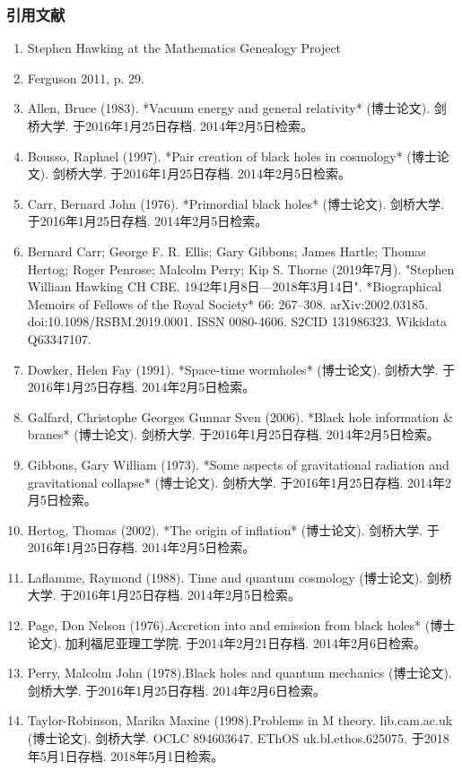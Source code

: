 \subsubsection{引用文献} 
\begin{enumerate}
\item Stephen Hawking at the Mathematics Genealogy Project  
\item Ferguson 2011, p. 29.  
\item Allen, Bruce (1983). *Vacuum energy and general relativity* (博士论文). 剑桥大学. 于2016年1月25日存档. 2014年2月5日检索。  
\item Bousso, Raphael (1997). *Pair creation of black holes in cosmology* (博士论文). 剑桥大学. 于2016年1月25日存档. 2014年2月5日检索。  
\item Carr, Bernard John (1976). *Primordial black holes* (博士论文). 剑桥大学. 于2016年1月25日存档. 2014年2月5日检索。  
\item Bernard Carr; George F. R. Ellis; Gary Gibbons; James Hartle; Thomas Hertog; Roger Penrose; Malcolm Perry; Kip S. Thorne (2019年7月). "Stephen William Hawking CH CBE. 1942年1月8日—2018年3月14日". *Biographical Memoirs of Fellows of the Royal Society* 66: 267–308. arXiv:2002.03185. doi:10.1098/RSBM.2019.0001. ISSN 0080-4606. S2CID 131986323. Wikidata Q63347107.  
\item Dowker, Helen Fay (1991). *Space-time wormholes* (博士论文). 剑桥大学. 于2016年1月25日存档. 2014年2月5日检索。  
\item Galfard, Christophe Georges Gunnar Sven (2006). *Black hole information & branes* (博士论文). 剑桥大学. 于2016年1月25日存档. 2014年2月5日检索。  
\item Gibbons, Gary William (1973). *Some aspects of gravitational radiation and gravitational collapse* (博士论文). 剑桥大学. 于2016年1月25日存档. 2014年2月5日检索。  
\item Hertog, Thomas (2002). *The origin of inflation* (博士论文). 剑桥大学. 于2016年1月25日存档. 2014年2月5日检索。  
\item Laflamme, Raymond (1988). Time and quantum cosmology (博士论文). 剑桥大学. 于2016年1月25日存档. 2014年2月5日检索。  
\item Page, Don Nelson (1976).Accretion into and emission from black holes* (博士论文). 加利福尼亚理工学院. 于2014年2月21日存档. 2014年2月6日检索。  
\item Perry, Malcolm John (1978).Black holes and quantum mechanics (博士论文). 剑桥大学. 于2016年1月25日存档. 2014年2月6日检索。  
\item Taylor-Robinson, Marika Maxine (1998).Problems in M theory. lib.cam.ac.uk (博士论文). 剑桥大学. OCLC 894603647. EThOS uk.bl.ethos.625075. 于2018年5月1日存档. 2018年5月1日检索。  

\end{enumerate}

